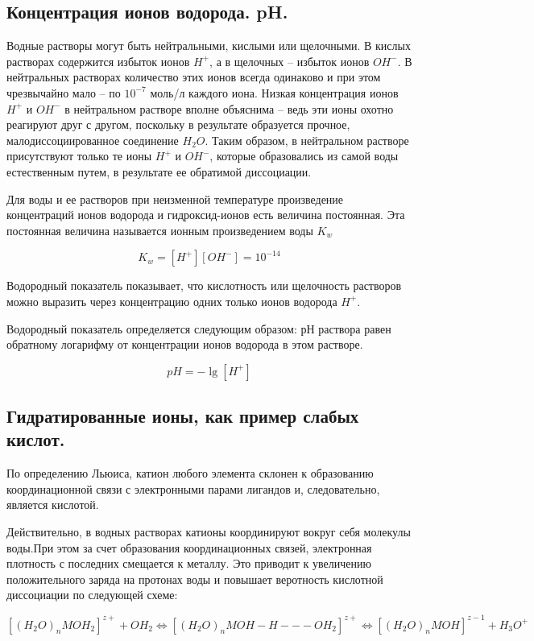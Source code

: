 \documentclass[14pt,a4paper]{scrartcl}
\begin{document}
\subsection{Концентрация ионов водорода. pH.}

Водные растворы могут быть нейтральными, кислыми или щелочными. В кислых растворах содержится избыток ионов $H^+$, а в щелочных – избыток ионов $OH^-$. В нейтральных растворах количество этих ионов всегда одинаково и при этом чрезвычайно мало – по $10^{-7}$ моль/л каждого иона. Низкая концентрация ионов $H^+$ и $OH^-$ в нейтральном растворе вполне объяснима – ведь эти ионы охотно реагируют друг с другом, поскольку в результате образуется прочное, малодиссоциированное соединение $H_2O$. Таким образом, в нейтральном растворе присутствуют только те ионы $H^+$ и $OH^-$, которые образовались из самой воды естественным путем, в результате ее обратимой диссоциации.

Для воды и ее растворов при неизменной температуре произведение концентраций ионов водорода и гидроксид-ионов есть величина постоянная. Эта постоянная величина называется ионным произведением воды $K_w$

$$K_w = \left[H^+\right]\left[OH^-\right] = 10^{-14}$$

Водородный показатель показывает, что кислотность или щелочность растворов можно выразить через концентрацию одних только ионов водорода $H^+$.

Водородный показатель определяется следующим образом: рН раствора равен обратному логарифму от концентрации ионов водорода в этом растворе.

$$pH = -\lg\left[H^+\right]$$

\subsection{Гидратированные ионы, как пример слабых кислот.}

По определению Льюиса, катион любого элемента склонен к образованию координационной связи с электронными парами лигандов и, следовательно, является кислотой.

Действительно, в водных растворах катионы координируют вокруг себя молекулы воды.При этом за счет образования координационных связей, электронная плотность с последних смещается к металлу. Это приводит к увеличению положительного заряда на протонах воды и повышает веротность кислотной диссоциации по следующей схеме:

$$\left[(H_2O)_n MOH_2\right]^{z+} + OH_2 \Leftrightarrow \left[(H_2O)_n MOH-H---OH_2\right]^{z+} \Leftrightarrow \left[(H_2O)_n MOH\right]^{z-1} + H_3O^+$$
\end{document}

